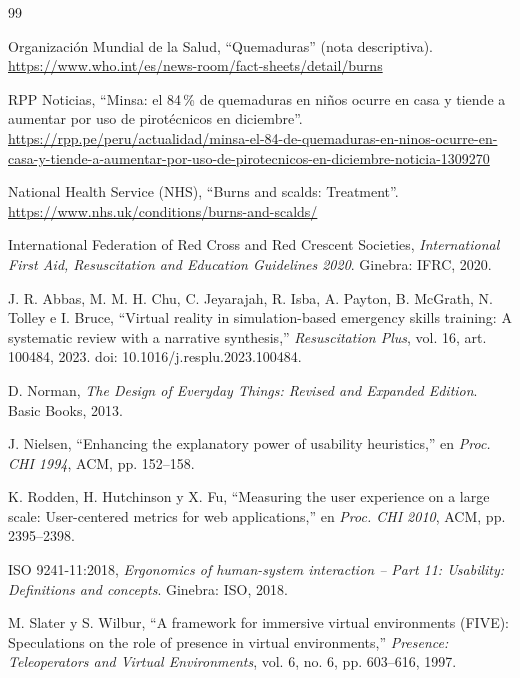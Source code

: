 \documentclass[11pt,a4paper]{article}
\begin{document}
\begin{thebibliography}{99}

Organización Mundial de la Salud, ``Quemaduras'' (nota descriptiva). \url{https://www.who.int/es/news-room/fact-sheets/detail/burns}

RPP Noticias, ``Minsa: el 84\,\% de quemaduras en niños ocurre en casa y tiende a aumentar por uso de pirotécnicos en diciembre''. \url{https://rpp.pe/peru/actualidad/minsa-el-84-de-quemaduras-en-ninos-ocurre-en-casa-y-tiende-a-aumentar-por-uso-de-pirotecnicos-en-diciembre-noticia-1309270}

National Health Service (NHS), ``Burns and scalds: Treatment''. \url{https://www.nhs.uk/conditions/burns-and-scalds/}

International Federation of Red Cross and Red Crescent Societies, \textit{International First Aid, Resuscitation and Education Guidelines 2020}. Ginebra: IFRC, 2020.

J. R. Abbas, M. M. H. Chu, C. Jeyarajah, R. Isba, A. Payton, B. McGrath, N. Tolley e I. Bruce, ``Virtual reality in simulation-based emergency skills training: A systematic review with a narrative synthesis,'' \textit{Resuscitation Plus}, vol. 16, art. 100484, 2023. doi: 10.1016/j.resplu.2023.100484.

D. Norman, \textit{The Design of Everyday Things: Revised and Expanded Edition}. Basic Books, 2013.

J. Nielsen, ``Enhancing the explanatory power of usability heuristics,'' en \textit{Proc. CHI 1994}, ACM, pp. 152--158.

K. Rodden, H. Hutchinson y X. Fu, ``Measuring the user experience on a large scale: User-centered metrics for web applications,'' en \textit{Proc. CHI 2010}, ACM, pp. 2395--2398.

ISO 9241-11:2018, \textit{Ergonomics of human-system interaction -- Part 11: Usability: Definitions and concepts}. Ginebra: ISO, 2018.

M. Slater y S. Wilbur, ``A framework for immersive virtual environments (FIVE): Speculations on the role of presence in virtual environments,'' \textit{Presence: Teleoperators and Virtual Environments}, vol. 6, no. 6, pp. 603--616, 1997.

\end{thebibliography}
\end{document}
